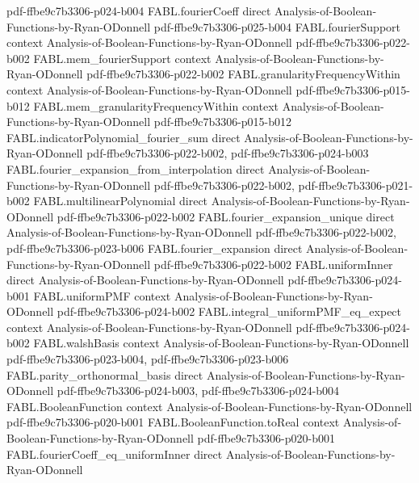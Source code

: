 \begin{theorem}
{    pdf-ffbe9c7b3306-p024-b004}
\proofstep
  {FABL.fourierCoeff}
  {direct}
  {Analysis-of-Boolean-Functions-by-Ryan-ODonnell}
  {pdf-ffbe9c7b3306-p025-b004}
\proofstep
  {FABL.fourierSupport}
  {context}
  {Analysis-of-Boolean-Functions-by-Ryan-ODonnell}
  {pdf-ffbe9c7b3306-p022-b002}
\proofstep
  {FABL.mem_fourierSupport}
  {context}
  {Analysis-of-Boolean-Functions-by-Ryan-ODonnell}
  {pdf-ffbe9c7b3306-p022-b002}
\proofstep
  {FABL.granularityFrequencyWithin}
  {context}
  {Analysis-of-Boolean-Functions-by-Ryan-ODonnell}
  {pdf-ffbe9c7b3306-p015-b012}
\proofstep
  {FABL.mem_granularityFrequencyWithin}
  {context}
  {Analysis-of-Boolean-Functions-by-Ryan-ODonnell}
  {pdf-ffbe9c7b3306-p015-b012}
\proofstep
  {FABL.indicatorPolynomial_fourier_sum}
  {direct}
  {Analysis-of-Boolean-Functions-by-Ryan-ODonnell}
  {pdf-ffbe9c7b3306-p022-b002,
    pdf-ffbe9c7b3306-p024-b003}
\proofstep
  {FABL.fourier_expansion_from_interpolation}
  {direct}
  {Analysis-of-Boolean-Functions-by-Ryan-ODonnell}
  {pdf-ffbe9c7b3306-p022-b002,
    pdf-ffbe9c7b3306-p021-b002}
\proofstep
  {FABL.multilinearPolynomial}
  {direct}
  {Analysis-of-Boolean-Functions-by-Ryan-ODonnell}
  {pdf-ffbe9c7b3306-p022-b002}
\proofstep
  {FABL.fourier_expansion_unique}
  {direct}
  {Analysis-of-Boolean-Functions-by-Ryan-ODonnell}
  {pdf-ffbe9c7b3306-p022-b002,
    pdf-ffbe9c7b3306-p023-b006}
\proofstep
  {FABL.fourier_expansion}
  {direct}
  {Analysis-of-Boolean-Functions-by-Ryan-ODonnell}
  {pdf-ffbe9c7b3306-p022-b002}
\proofstep
  {FABL.uniformInner}
  {direct}
  {Analysis-of-Boolean-Functions-by-Ryan-ODonnell}
  {pdf-ffbe9c7b3306-p024-b001}
\proofstep
  {FABL.uniformPMF}
  {context}
  {Analysis-of-Boolean-Functions-by-Ryan-ODonnell}
  {pdf-ffbe9c7b3306-p024-b002}
\proofstep
  {FABL.integral_uniformPMF_eq_expect}
  {context}
  {Analysis-of-Boolean-Functions-by-Ryan-ODonnell}
  {pdf-ffbe9c7b3306-p024-b002}
\proofstep
  {FABL.walshBasis}
  {context}
  {Analysis-of-Boolean-Functions-by-Ryan-ODonnell}
  {pdf-ffbe9c7b3306-p023-b004,
    pdf-ffbe9c7b3306-p023-b006}
\proofstep
  {FABL.parity_orthonormal_basis}
  {direct}
  {Analysis-of-Boolean-Functions-by-Ryan-ODonnell}
  {pdf-ffbe9c7b3306-p024-b003,
    pdf-ffbe9c7b3306-p024-b004}
\proofstep
  {FABL.BooleanFunction}
  {context}
  {Analysis-of-Boolean-Functions-by-Ryan-ODonnell}
  {pdf-ffbe9c7b3306-p020-b001}
\proofstep
  {FABL.BooleanFunction.toReal}
  {context}
  {Analysis-of-Boolean-Functions-by-Ryan-ODonnell}
  {pdf-ffbe9c7b3306-p020-b001}
\proofstep
  {FABL.fourierCoeff_eq_uniformInner}
  {direct}
  {Analysis-of-Boolean-Functions-by-Ryan-ODonnell}

\end{theorem}
